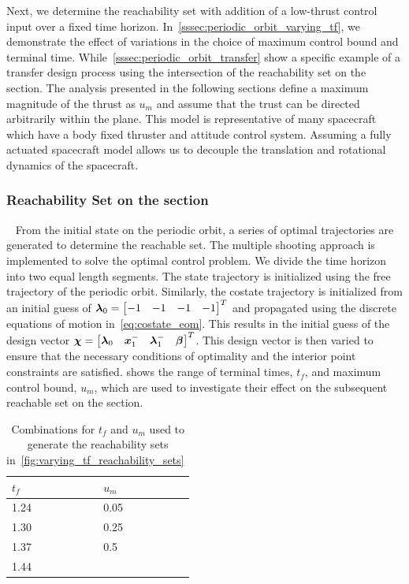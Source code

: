 \documentclass[smallcondensed]{svjour3}
\begin{document}
Next, we determine the reachability set with addition of a low-thrust control input over a fixed time horizon.
In~\cref{sssec:periodic_orbit_varying_tf}, we demonstrate the effect of variations in the choice of maximum control bound and terminal time.
While~\cref{sssec:periodic_orbit_transfer} show a specific example of a transfer design process using the intersection of the reachability set on the \Poincare section.
The analysis presented in the following sections define a maximum magnitude of the thrust as \( u_{m} \) and assume that the trust can be directed arbitrarily within the plane. 
This model is representative of many spacecraft which have a body fixed thruster and attitude control system.
Assuming a fully actuated spacecraft model allows us to decouple the translation and rotational dynamics of the spacecraft.

\subsubsection{Reachability Set on the \Poincare section}~\label{sssec:periodic_orbit_varying_tf}
From the initial state on the periodic orbit, a series of optimal trajectories are generated to determine the reachable set.
The multiple shooting approach is implemented to solve the optimal control problem. 
We divide the time horizon into two equal length segments. 
The state trajectory is initialized using the free trajectory of the periodic orbit. 
Similarly, the costate trajectory is initialized from an initial guess of \( \bm{\lambda}_0 = \begin{bmatrix} -1 & -1 & -1 & -1\end{bmatrix}^T\) and propagated using the discrete equations of motion in~\cref{eq:costate_eom}.
This results in the initial guess of the design vector \( \bm{\chi} = \begin{bmatrix} \bm{\lambda}_0 & \bm{x}_1^{-} & \bm{\lambda}_1^{-} & \bm{\beta} \end{bmatrix}^T\).
This design vector is then varied to ensure that the necessary conditions of optimality and the interior point constraints are satisfied. 
 shows the range of terminal times, \( t_f \), and maximum control bound, \( u_m \), which are used to investigate their effect on the subsequent reachable set on the \Poincare section.
\begin{table}
    \centering
    \begin{tabular}{ll}  
        \toprule
        \(t_f\) & \( u_m \) \\
        \midrule
        1.24 & 0.05 \\
        1.30 & 0.25 \\
        1.37 & 0.5 \\
        1.44 & \\
        \bottomrule
    \end{tabular}
    \caption{Combinations for \( t_f \) and \( u_m\) used to generate the reachability sets in~\cref{fig:varying_tf_reachability_sets}~\label{tab:varying_tf}}
\end{table}
\end{document}
